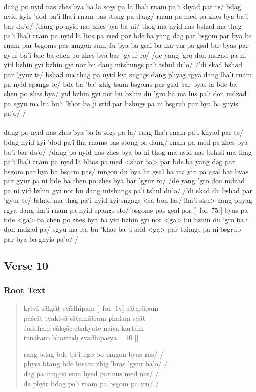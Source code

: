 \documentclass[12pt]{article}
\begin{document}
\textbf{\TVA}\\
dang po nyid nas zhes bya ba la sogs pa la lha'i rnam pa'i khyad par te/ bdag nyid kyis 'dod pa'i lha'i rnam pas stong pa dang/ rnam pa med pa zhes bya ba'i bar du'o/ /dang po nyid nas zhes bya ba ni/ thog ma nyid nas bshad ma thag pa'i lha'i rnam pa nyid la ltos pa med par bde ba yang dag par bsgom par bya ba rnam par bsgoms pas mngon sum du bya ba gsal ba ma yin pa gsal bar byas par gyur ba'i bde ba chen po zhes bya bar 'gyur ro/ /de yang 'gro don mdzad pa ni yid bzhin gyi bzhin gyi nor bu dang mtshungs pa'i tshul du'o/ /'di skad bshad par 'gyur te/ bshad ma thag pa nyid kyi sngags dang phyag rgya dang lha'i rnam pa nyid spangs te/ bde ba 'ba' zhig tsam bsgoms pas gsal bar byas la bde ba chen po zhes bya/ yid bzhin gyi nor bu bzhin du 'gro ba ma lus pa'i don mdzad pa sgyu ma lta bu'i 'khor ba ji srid par bzhugs pa ni bsgrub par bya ba gnyis pa'o/ /\\

\textbf{\TVB}\\
dang po nyid nas zhes bya ba la sogs pa la/ rang lha'i rnam pa'i khyad par te/ bdag nyid kyi 'dod pa'i lha rnams pas stong pa dang/ rnam pa med pa zhes bya ba'i bar du'o/ /dang po nyid nas zhes bya ba ni thog ma nyid nas bshad ma thag pa'i lha'i rnam pa nyid la bltos pa med <shar ba> par bde ba yang dag par bsgom par bya ba bsgom pas/ mngon du bya ba gsal ba ma yin pa gsal bar byas par gyur pa ni bde ba chen po zhes bya bar 'gyur ro/ /de yang 'gro don mdzad pa ni yid bzhin gyi nor bu dang mtshungs pa'i tshul du'o/ /'di skad du bshad par 'gyur te/ bshad ma thag pa'i nyid kyi sngags <sa bon las/ lha'i sku> dang phyag rgya dang lha'i rnam pa nyid spangs ste/ bsgoms pas gsal por [\TVB\ fol. 75r] byas pa bde <ga> ba chen po zhes bya ba yid bzhin gyi nor <ga> bu bzhin du 'gro ba'i don mdzad pa/ sgyu ma lta bu 'khor ba ji srid <ga> par bzhugs pa ni bsgrub par bya ba gnyis pa'o/ /

\subsection{Verse 10}
\subsubsection{Root Text}
\begin{quote}
	kṛtvā sākṣāt svādhipaṃ [\MS\ fol.\ 1v] sātarūpaṃ \\
	paścāt tyaktvā sātamātraṃ phalaṃ syāt |\\
	śuddhaṃ sākṣāc chakyate naiva kartuṃ \\
	tenākāro bhāvitaḥ svādhipasya || 10 ||

	rang bdag bde ba'i ngo bo mngon byas nas/ /\\
	phyes btang bde btsam zhig 'bras 'gyur ba'o/ /\\
	dag pa mngon sum byed par nus med nas/ /\\
	de phyir bdag po'i rnam pa bsgom pa yin/ /
\end{quote}
\end{document}
